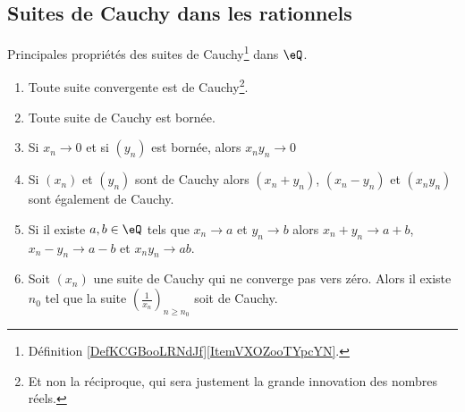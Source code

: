 \subsection{Suites de Cauchy dans les rationnels}

\begin{proposition}        \label{PropFFDJooAapQlP}
	Principales propriétés des suites de Cauchy\footnote{Définition \ref{DefKCGBooLRNdJf}\ref{ItemVXOZooTYpcYN}.} dans \( \eQ\).
	\begin{enumerate}
		\item       \label{ItemRKCIooJguHdji}
		      Toute suite convergente est de Cauchy\footnote{Et non la réciproque, qui sera justement la grande innovation des nombres réels.}.
		\item       \label{ItemRKCIooJguHdjii}
		      Toute suite de Cauchy est bornée.
		\item       \label{ItemRKCIooJguHdjiii}
		      Si \( x_n\to 0\) et si \( (y_n)\) est bornée, alors \( x_ny_n\to 0\)
		\item
		      Si \( (x_n)\) et \( (y_n)\) sont de Cauchy alors \( (x_n+y_n)\), \( (x_n-y_n)\) et \( (x_ny_n)\) sont également de Cauchy.
		\item       \label{ITEMooIAFSooAIUpAN}
		      Si il existe \( a,b\in \eQ\) tels que \( x_n\to a \) et \( y_n\to b \) alors \( x_n+y_n\to a+b\), \( x_n-y_n\to a-b\) et \(  x_ny_n\to ab  \).
		\item   \label{ItemRKCIooJguHdjvi}
		      Soit \( (x_n)\) une suite de Cauchy qui ne converge pas vers zéro. Alors il existe \( n_0\) tel que la suite \( \left( \frac{1}{ x_n } \right)_{n\geq n_0}\) soit de Cauchy.
	\end{enumerate}
\end{proposition}

